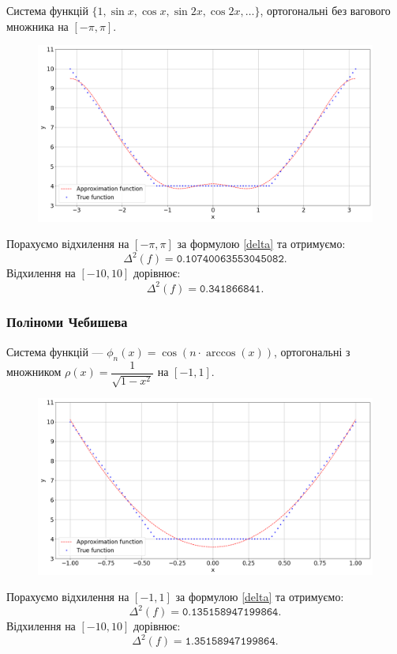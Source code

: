 Система функцій $\{1, \sin x, \cos x, \sin 2x, \cos 2x, \ldots\}$, ортогональні без вагового множника на $[-\pi,\pi]$.

\begin{figure}[H]
    \centering
    \includegraphics[width=\textwidth]{trigonometric.png}
\end{figure}
Порахуємо відхилення на $[-\pi, \pi]$ за формулою \eqref{delta} та отримуємо: \[ \Delta^2(f) = \texttt{0.10740063553045082}. \] Відхилення на $[-10, 10]$ дорівнює: \[ \Delta^2(f) = \texttt{0.341866841}. \]

\newpage

\subsubsection{Поліноми Чебишева}

Система функцій --- $\phi_n(x) = \cos (n \cdot \arccos(x))$, ортогональні з множником $\rho(x) = \dfrac{1}{\sqrt{1 - x^2}}$ на $[-1,1]$.

\begin{figure}[H]
    \centering
    \includegraphics[width=\textwidth]{chebyshev.png}
\end{figure}
Порахуємо відхилення на $[-1, 1]$ за формулою \eqref{delta} та отримуємо: \[ \Delta^2(f) = \texttt{0.135158947199864}. \] Відхилення на $[-10, 10]$ дорівнює: \[ \Delta^2(f) = \texttt{1.35158947199864}. \]

